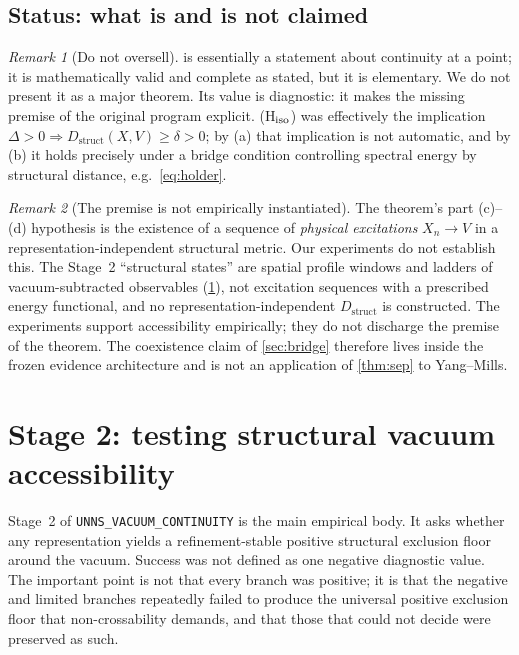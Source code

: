 \documentclass[11pt,a4paper]{article}
\theoremstyle{definition}
\theoremstyle{remark}
\newtheorem{remark}{Remark}
\newcommand{\Dstruct}{D_{\mathrm{struct}}}
\begin{document}
\subsection{Status: what is and is not claimed}
\begin{remark}[Do not oversell]
 is essentially a statement about continuity at a point; it is mathematically valid and complete as stated, but it is elementary. We do not present it as a major theorem. Its value is diagnostic: it makes the missing premise of the original program explicit. (H$_{\rm iso}$) was effectively the implication $\Delta>0\Rightarrow\Dstruct(X,V)\ge\delta>0$; by (a) that implication is not automatic, and by (b) it holds precisely under a bridge condition controlling spectral energy by structural distance, e.g.\ \eqref{eq:holder}.
\end{remark}
\begin{remark}[The premise is not empirically instantiated]\label{rem:premise}
The theorem's part (c)--(d) hypothesis is the existence of a sequence of \emph{physical excitations} $X_n\to V$ in a representation-independent structural metric. Our experiments do not establish this. The Stage~2 ``structural states'' are spatial profile windows and ladders of vacuum-subtracted observables (\cref{sec:stage2}), not excitation sequences with a prescribed energy functional, and no representation-independent $\Dstruct$ is constructed. The experiments support accessibility empirically; they do not discharge the premise of the theorem. The coexistence claim of \cref{sec:bridge} therefore lives inside the frozen evidence architecture and is not an application of \cref{thm:sep} to Yang--Mills.
\end{remark}

\section{Stage 2: testing structural vacuum accessibility}\label{sec:stage2}

Stage~2 of \texttt{UNNS\_VACUUM\_CONTINUITY} is the main empirical body. It asks whether any representation yields a refinement-stable positive structural exclusion floor around the vacuum. Success was not defined as one negative diagnostic value. The important point is not that every branch was positive; it is that the negative and limited branches repeatedly failed to produce the universal positive exclusion floor that non-crossability demands, and that those that could not decide were preserved as such.
\end{document}
